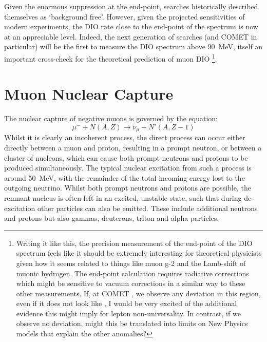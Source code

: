 Given the enormous suppression at the end-point, \mueconv searches historically described themselves as `background free'.
However, given the projected sensitivities of modern experiments, the \ac{DIO} rate close to the end-point of the spectrum is now at an appreciable level.
Indeed, the next generation of searches (and COMET \phaseI in particular) will be the first to measure the \ac{DIO} spectrum above 90~MeV, itself an important cross-check for the theoretical prediction of muon \ac{DIO}%
\footnote{Writing it like this, the precision measurement of the end-point of the DIO spectrum feels like it should be extremely interesting for theoretical physicists given how it seems related to things like muon g-2 and the Lamb-shift of muonic hydrogen. The end-point calculation requires radiative corrections which might be sensitive to vacuum corrections in a similar way to these other measurements.  If, at COMET \phaseI, we observe any deviation in this region, even if it does not look like \mueconv, I would be very excited of the additional evidence this might imply for lepton non-universality.  In contrast, if we observe no deviation, might this be translated into limits on New Physics models that explain the other anomalies?}.

\section{Muon Nuclear Capture}
The nuclear capture of negative muons is governed by the equation:
\begin{equation}
\mu^-+N(A,Z)\rightarrow \nu_\mu+N'(A,Z-1)
\end{equation}
Whilst it is clearly an incoherent process, the direct process can occur either directly between a muon and proton, resulting in a prompt neutron, or between a cluster of nucleons, which can cause both prompt neutrons and protons to be produced simultaneously.
The typical nuclear excitation from such a process is around 50~MeV, with the remainder of the total incoming energy lost to the outgoing neutrino.
Whilst both prompt neutrons and protons are possible, the remnant nucleus is often left in an excited, unstable state, such that during de-excitation other particles can also be emitted.
These include additional neutrons and protons but also gammas, deuterons, triton and alpha particles.
\FigMuecMuCapture

